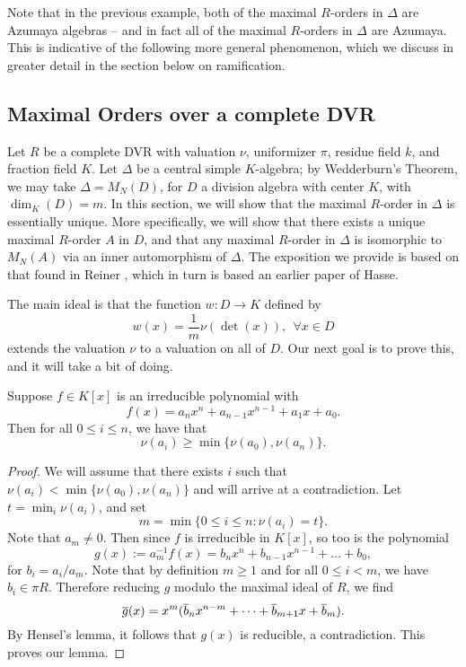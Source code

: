 Note that in the previous example, both of the maximal $R$-orders in $\Delta$ are Azumaya algebras -- and in fact all of the maximal $R$-orders in $\Delta$ are Azumaya.  This is indicative of the following more general phenomenon, which we discuss in greater detail in the section below on ramification.

\subsection{Maximal Orders over a complete DVR}
Let $R$ be a complete DVR with valuation $\nu$, uniformizer $\pi$, residue field $k$, and fraction field $K$.  Let $\Delta$ be a central simple $K$-algebra; by Wedderburn's Theorem, we may take $\Delta = M_N(D)$, for $D$ a division algebra with center $K$, with $\dim_K(D) = m$.  In this section, we will show that the maximal $R$-order in $\Delta$ is essentially unique.  More specifically, we will show that there exists a unique maximal $R$-order $A$ in $D$, and that any maximal $R$-order in $\Delta$ is isomorphic to $M_N(A)$ via an inner automorphism of $\Delta$.  The exposition we provide is based on that found in Reiner \cite{reiner1975maximal}, which in turn is based an earlier paper of Hasse.

The main ideal is that the function $w: D\rightarrow K$ defined by
$$w(x) = \frac{1}{m}\nu(\det(x)),\ \ \forall x\in D$$
extends the valuation $\nu$ to a valuation on all of $D$.  Our next goal is to prove this, and it will take a bit of doing.

\begin{lem}
Suppose $f\in K[x]$ is an irreducible polynomial with
$$f(x) = a_nx^n + a_{n-1}x^{n-1} + a_1x + a_0.$$
Then for all $0\leq i\leq n$, we have that
$$\nu(a_i)\geq \min\{\nu(a_0),\nu(a_n)\}.$$
\end{lem}
\begin{proof}
We will assume that there exists $i$ such that $\nu(a_i) <\min\{\nu(a_0),\nu(a_n)\}$ and will arrive at a contradiction.  Let $t = \min_i \nu(a_i)$, and set
$$m = \min\{0\leq i\leq n: \nu(a_i) = t\}.$$
Note that $a_m\neq 0$.  Then since $f$ is irreducible in $K[x]$, so too is the polynomial
$$g(x) := a_m^{-1}f(x) = b_nx^n + b_{n-1}x^{n-1} + \dots + b_0,$$
for $b_i = a_i/a_m$.  Note that by definition $m\geq 1$ and for all $0\leq i<m$, we have $b_i\in \pi R$.  Therefore reducing $g$ modulo the maximal ideal of $R$, we find
$$\overline{g}(x) = x^m(\overline{b}_nx^{n-m} + \dots + \overline{b}_{m+1}x + \overline{b}_{m}).$$
By Hensel's lemma, it follows that $g(x)$ is reducible, a contradiction.  This proves our lemma.
\end{proof}

